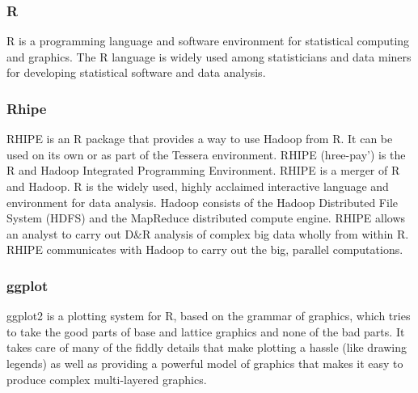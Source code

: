 \subsubsection{R}
R is a programming language and software environment for statistical computing and graphics. The R language is widely used among statisticians and data miners for developing statistical software and data analysis.

\subsubsection{Rhipe}
RHIPE is an R package that provides a way to use Hadoop from R. It can be used on its own or as part of the Tessera environment. RHIPE (hree-pay') is the R and Hadoop Integrated Programming Environment. RHIPE is a merger of R and Hadoop. R is the widely used, highly acclaimed interactive language and environment for data analysis. Hadoop consists of the Hadoop Distributed File System (HDFS) and the MapReduce distributed compute engine. RHIPE allows an analyst to carry out D\&R analysis of complex big data wholly from within R. RHIPE communicates with Hadoop to carry out the big, parallel computations. 

\subsubsection{ggplot}
ggplot2 is a plotting system for R, based on the grammar of graphics, which tries to take the good parts of base and lattice graphics and none of the bad parts. It takes care of many of the fiddly details that make plotting a hassle (like drawing legends) as well as providing a powerful model of graphics that makes it easy to produce complex multi-layered graphics.




